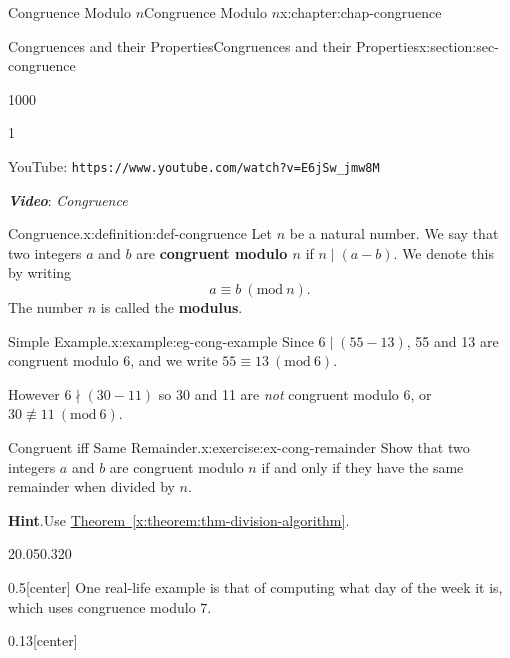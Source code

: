 \documentclass[oneside,10pt,]{book}
\newcommand{\blocktitlefont}{\relax}
\newcommand{\xreffont}{\relax}
\newcommand{\mono}[1]{\texttt{#1}}
\newcommand{\alert}[1]{\textbf{\textit{#1}}}
\newcommand{\terminology}[1]{\textbf{#1}}
\numberwithin{equation}{section}
\newlength{\qrsize}
\newlength{\previewwidth}
\newcommand{\Mod}[1]{\ \left(\mathrm{mod}\ #1\right)}
\begin{document}
\begin{chapterptx}{Congruence Modulo \(n\)}{}{Congruence Modulo \(n\)}{}{}{x:chapter:chap-congruence}
\begin{sectionptx}{Congruences and their Properties}{}{Congruences and their Properties}{}{}{x:section:sec-congruence}
\begin{sidebyside}{1}{0}{0}{0}
\begin{sbspanel}{1}
\begin{tcbraster}[raster columns=2, raster column skip=1pt, raster halign=center, raster force size=false, raster left skip=0pt, raster right skip=0pt]
\begin{tcolorbox}[previewstyle, width=\previewwidth]
\end{tcolorbox}%
\begin{tcolorbox}[qrstyle]%
{\hypersetup{urlcolor=black}}%
\end{tcolorbox}%
\begin{tcolorbox}[captionstyle]%
\small YouTube: \mono{https://www.youtube.com/watch?v=E6jSw\_jmw8M}\end{tcolorbox}%
\end{tcbraster}%
\end{sbspanel}%
\end{sidebyside}%
\par
\alert{Video}: \emph{Congruence}%
\begin{definition}{Congruence.}{x:definition:def-congruence}%
Let \(n\) be a natural number. We say that two integers \(a\) and \(b\) are \terminology{congruent modulo \(n\)} if \(n \mid (a-b)\). We denote this by writing%
\begin{equation*}
a \equiv b \Mod{n}\text{.}
\end{equation*}
The number \(n\) is called the \terminology{modulus}. \label{g:notation:id537506}%
\end{definition}
\begin{example}{Simple Example.}{x:example:eg-cong-example}%
Since \(6 \mid (55-13)\), 55 and 13 are congruent modulo 6, and we write \(55 \equiv 13 \Mod{6}\).%
\par
However \(6 \nmid (30-11)\) so 30 and 11 are \emph{not} congruent modulo 6, or \(30 \not\equiv 11 \Mod{6}\).%
\end{example}
\begin{inlineexercise}{Congruent iff Same Remainder.}{x:exercise:ex-cong-remainder}%
Show that two integers \(a\) and \(b\) are congruent modulo \(n\) if and only if they have the same remainder when divided by \(n\).%
\par\smallskip%
\noindent\textbf{\blocktitlefont Hint}.\hypertarget{g:hint:id537602}{}\quad{}Use \hyperref[x:theorem:thm-division-algorithm]{Theorem~{\xreffont\ref{x:theorem:thm-division-algorithm}}}.%
\end{inlineexercise}%
\begin{sidebyside}{2}{0.05}{0.32}{0}%
\begin{sbspanel}{0.5}[center]%
One real-life example is that of computing what day of the week it is, which uses congruence modulo \(7\).%
\end{sbspanel}%
\begin{sbspanel}{0.13}[center]%

\end{sbspanel}
\end{sidebyside}
\end{sectionptx}
\end{chapterptx}
\end{document}
